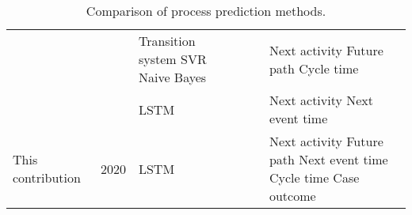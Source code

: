 \begin{table}[]
\begin{tabularx}{\textwidth}{p{3.5cm} l p{3.2cm} p{1.1cm} p{1.1cm} p{3cm}}
		 \citeauthor{DBLP:journals/computing/PolatoSBL18} \cite{DBLP:journals/computing/PolatoSBL18}&  \citeyear{DBLP:journals/computing/PolatoSBL18} &  Transition system \newline SVR \newline Naive Bayes &  \checkmark & \xmark & Next activity  \newline Future path \newline Cycle time \\
		 
		 \citeauthor{DBLP:conf/icpm/ParkS19} \cite{DBLP:conf/icpm/ParkS19} & \citeyear{DBLP:conf/icpm/ParkS19} & LSTM & \checkmark & \xmark &Next activity \newline Next event time  \\
		 
		 This contribution &  2020 &  LSTM & \checkmark & \checkmark &  Next activity \newline Future path \newline Next event time  \newline Cycle time \newline Case outcome 
	 	\\ \bottomrule
	\end{tabularx}
	\caption[Comparison  of process prediction methods]{Comparison  of process prediction methods.}
	\label{tab:preliminaries}
\end{table}